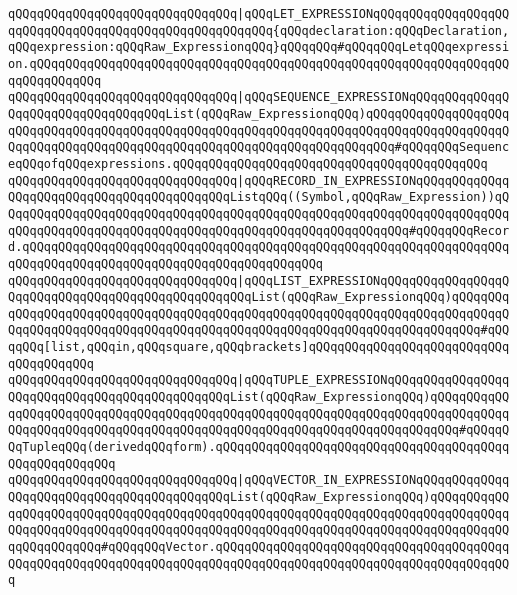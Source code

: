 \verb|qQQqqQQqqQQqqQQqqQQqqQQqqQQqqQQq|\verb#|qQQqLET_EXPRESSIONqQQqqQQqqQQqqQQqqQQqqQQqqQQqqQQqqQQqqQQqqQQqqQQqqQQqqQQq{qQQqdeclaration:qQQqDeclaration,qQQqexpression:qQQqRaw_ExpressionqQQq}qQQqqQQq#\verb|#qQQqqQQqLetqQQqexpression.qQQqqQQqqQQqqQQqqQQqqQQqqQQqqQQqqQQqqQQqqQQqqQQqqQQqqQQqqQQqqQQqqQQqqQQqqQQqqQQq|\newline
\verb|qQQqqQQqqQQqqQQqqQQqqQQqqQQqqQQq|\verb#|qQQqSEQUENCE_EXPRESSIONqQQqqQQqqQQqqQQqqQQqqQQqqQQqqQQqqQQqList(qQQqRaw_ExpressionqQQq)qQQqqQQqqQQqqQQqqQQqqQQqqQQqqQQqqQQqqQQqqQQqqQQqqQQqqQQqqQQqqQQqqQQqqQQqqQQqqQQqqQQqqQQqqQQqqQQqqQQqqQQqqQQqqQQqqQQqqQQqqQQqqQQqqQQqqQQqqQQqqQQq#\verb|#qQQqqQQqSequenceqQQqofqQQqexpressions.qQQqqQQqqQQqqQQqqQQqqQQqqQQqqQQqqQQqqQQqqQQq|\newline
\verb|qQQqqQQqqQQqqQQqqQQqqQQqqQQqqQQq|\verb#|qQQqRECORD_IN_EXPRESSIONqQQqqQQqqQQqqQQqqQQqqQQqqQQqqQQqqQQqqQQqqQQqListqQQq((Symbol,qQQqRaw_Expression))qQQqqQQqqQQqqQQqqQQqqQQqqQQqqQQqqQQqqQQqqQQqqQQqqQQqqQQqqQQqqQQqqQQqqQQqqQQqqQQqqQQqqQQqqQQqqQQqqQQqqQQqqQQqqQQqqQQqqQQqqQQqqQQq#\verb|#qQQqqQQqRecord.qQQqqQQqqQQqqQQqqQQqqQQqqQQqqQQqqQQqqQQqqQQqqQQqqQQqqQQqqQQqqQQqqQQqqQQqqQQqqQQqqQQqqQQqqQQqqQQqqQQqqQQqqQQqqQQq|\newline
\verb|qQQqqQQqqQQqqQQqqQQqqQQqqQQqqQQq|\verb#|qQQqLIST_EXPRESSIONqQQqqQQqqQQqqQQqqQQqqQQqqQQqqQQqqQQqqQQqqQQqqQQqqQQqList(qQQqRaw_ExpressionqQQq)qQQqqQQqqQQqqQQqqQQqqQQqqQQqqQQqqQQqqQQqqQQqqQQqqQQqqQQqqQQqqQQqqQQqqQQqqQQqqQQqqQQqqQQqqQQqqQQqqQQqqQQqqQQqqQQqqQQqqQQqqQQqqQQqqQQqqQQqqQQqqQQq#\verb|#qQQqqQQq[list,qQQqin,qQQqsquare,qQQqbrackets]qQQqqQQqqQQqqQQqqQQqqQQqqQQqqQQqqQQqqQQq|\newline
\verb|qQQqqQQqqQQqqQQqqQQqqQQqqQQqqQQq|\verb#|qQQqTUPLE_EXPRESSIONqQQqqQQqqQQqqQQqqQQqqQQqqQQqqQQqqQQqqQQqqQQqqQQqList(qQQqRaw_ExpressionqQQq)qQQqqQQqqQQqqQQqqQQqqQQqqQQqqQQqqQQqqQQqqQQqqQQqqQQqqQQqqQQqqQQqqQQqqQQqqQQqqQQqqQQqqQQqqQQqqQQqqQQqqQQqqQQqqQQqqQQqqQQqqQQqqQQqqQQqqQQqqQQqqQQq#\verb|#qQQqqQQqTupleqQQq(derivedqQQqform).qQQqqQQqqQQqqQQqqQQqqQQqqQQqqQQqqQQqqQQqqQQqqQQqqQQqqQQq|\newline
\verb|qQQqqQQqqQQqqQQqqQQqqQQqqQQqqQQq|\verb#|qQQqVECTOR_IN_EXPRESSIONqQQqqQQqqQQqqQQqqQQqqQQqqQQqqQQqqQQqqQQqqQQqList(qQQqRaw_ExpressionqQQq)qQQqqQQqqQQqqQQqqQQqqQQqqQQqqQQqqQQqqQQqqQQqqQQqqQQqqQQqqQQqqQQqqQQqqQQqqQQqqQQqqQQqqQQqqQQqqQQqqQQqqQQqqQQqqQQqqQQqqQQqqQQqqQQqqQQqqQQqqQQqqQQqqQQqqQQqqQQqqQQqqQQq#\verb|#qQQqqQQqVector.qQQqqQQqqQQqqQQqqQQqqQQqqQQqqQQqqQQqqQQqqQQqqQQqqQQqqQQqqQQqqQQqqQQqqQQqqQQqqQQqqQQqqQQqqQQqqQQqqQQqqQQqqQQqqQQq|\newline

